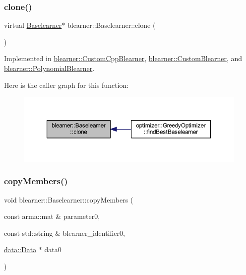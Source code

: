 \subsubsection{\texorpdfstring{clone()}{clone()}}
{\footnotesize\ttfamily virtual \mbox{\hyperlink{classblearner_1_1_baselearner}{Baselearner}}$\ast$ blearner\+::\+Baselearner\+::clone (\begin{DoxyParamCaption}{ }\end{DoxyParamCaption})\hspace{0.3cm}{\ttfamily [pure virtual]}}



Implemented in \mbox{\hyperlink{classblearner_1_1_custom_cpp_blearner_a8b76705131d397974cd208fdcfd70496}{blearner\+::\+Custom\+Cpp\+Blearner}}, \mbox{\hyperlink{classblearner_1_1_custom_blearner_a7ceeee2b7fffd11f376018bc1d3cfba1}{blearner\+::\+Custom\+Blearner}}, and \mbox{\hyperlink{classblearner_1_1_polynomial_blearner_a4a93ace818c330e5d1f572108ba061c0}{blearner\+::\+Polynomial\+Blearner}}.

Here is the caller graph for this function\+:\nopagebreak
\begin{figure}[H]
\begin{center}
\leavevmode
\includegraphics[width=350pt]{classblearner_1_1_baselearner_a8e12c6739f085917a7d2da6570c51a21_icgraph}
\end{center}
\end{figure}
\mbox{\label{classblearner_1_1_baselearner_ae8f114ca7c497f03c80de5981c7f811d}} 
\subsubsection{\texorpdfstring{copy\+Members()}{copyMembers()}}
{\footnotesize\ttfamily void blearner\+::\+Baselearner\+::copy\+Members (\begin{DoxyParamCaption}\item[{const arma\+::mat \&}]{parameter0,  }\item[{const std\+::string \&}]{blearner\+\_\+identifier0,  }\item[{\mbox{\hyperlink{classdata_1_1_data}{data\+::\+Data}} $\ast$}]{data0 }\end{DoxyParamCaption})}


